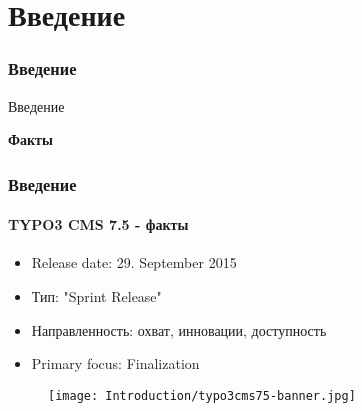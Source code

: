 %

\section{Введение}
\begin{frame}[fragile]
	\frametitle{Введение}

	\begin{center}\huge{Введение}\end{center}
	\begin{center}\huge{\color{typo3darkgrey}\textbf{Факты}}\end{center}

\end{frame}

\begin{frame}[fragile]
	\frametitle{Введение}
	\framesubtitle{TYPO3 CMS 7.5 - факты}

	\begin{itemize}
		\item Release date: 29. September 2015
		\item Тип: "Sprint Release"
		\item Направленность: охват, инновации, доступность
		\item Primary focus: Finalization
	\end{itemize}

	\begin{figure}
		\texttt{[image: Introduction/typo3cms75-banner.jpg]}
	\end{figure}

\end{frame}

